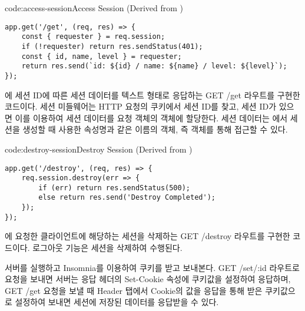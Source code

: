 \begin{code}{code:access-session}{Access Session (Derived from )}
\begin{verbatim}
app.get('/get', (req, res) => {
    const { requester } = req.session;
    if (!requester) return res.sendStatus(401);
    const { id, name, level } = requester;
    return res.send(`id: ${id} / name: ${name} / level: ${level}`);
});
\end{verbatim}
\end{code}

\은 에 세션 ID에 따른 세션 데이터를 텍스트 형태로 응답하는 GET /get 라우트를 구현한 코드이다. 세션 미들웨어는 HTTP 요청의 쿠키에서 세션 ID를 찾고, 세션 ID가 있으면 이를 이용하여 세션 데이터를 요청 객체의  객체에 할당한다. 세션 데이터는 에서 세션을 생성할 때 사용한 속성명과 같은 이름의 객체, 즉  객체를 통해 접근할 수 있다.

\begin{code}{code:destroy-session}{Destroy Session (Derived from )}
\begin{verbatim}
app.get('/destroy', (req, res) => {
    req.session.destroy(err => {
        if (err) return res.sendStatus(500);
        else return res.send('Destroy Completed');
    });
});
\end{verbatim}
\end{code}

\은 에 요청한 클라이언트에 해당하는 세션을 삭제하는 GET /destroy 라우트를 구현한 코드이다. 로그아웃 기능은 세션을 삭제하여 수행된다.


서버를 실행하고 Insomnia를 이용하여 쿠키를 받고 보내본다. GET /set/:id 라우트로 요청을 보내면 서버는 응답 헤더의 Set-Cookie 속성에 쿠키값을 설정하여 응답하며, GET /get 요청을 보낼 때 Header 탭에서 Cookie의 값을 응답을 통해 받은 쿠키값으로 설정하여 보내면 세션에 저장된 데이터를 응답받을 수 있다.


